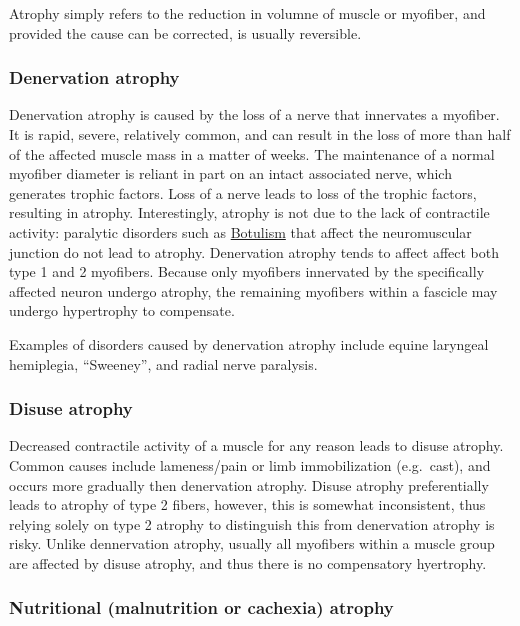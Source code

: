 \documentclass[openany]{book}
\begin{document}
Atrophy simply refers to the reduction in volumne of muscle or myofiber,
and provided the cause can be corrected, is usually reversible.

\subsubsection{Denervation atrophy}\label{denervation-atrophy}

Denervation atrophy is caused by the loss of a nerve that innervates a
myofiber. It is rapid, severe, relatively common, and can result in the
loss of more than half of the affected muscle mass in a matter of weeks.
The maintenance of a normal myofiber diameter is reliant in part on an
intact associated nerve, which generates trophic factors. Loss of a
nerve leads to loss of the trophic factors, resulting in atrophy.
Interestingly, atrophy is not due to the lack of contractile activity:
paralytic disorders such as \protect\hyperlink{botulism}{Botulism} that
affect the neuromuscular junction do not lead to atrophy. Denervation
atrophy tends to affect affect both type 1 and 2 myofibers. Because only
myofibers innervated by the specifically affected neuron undergo
atrophy, the remaining myofibers within a fascicle may undergo
hypertrophy to compensate.

Examples of disorders caused by denervation atrophy include equine
laryngeal hemiplegia, ``Sweeney'', and radial nerve paralysis.

\subsubsection{Disuse atrophy}\label{disuse-atrophy}

Decreased contractile activity of a muscle for any reason leads to
disuse atrophy. Common causes include lameness/pain or limb
immobilization (e.g.~cast), and occurs more gradually then denervation
atrophy. Disuse atrophy preferentially leads to atrophy of type 2
fibers, however, this is somewhat inconsistent, thus relying solely on
type 2 atrophy to distinguish this from denervation atrophy is risky.
Unlike dennervation atrophy, usually all myofibers within a muscle group
are affected by disuse atrophy, and thus there is no compensatory
hyertrophy.

\subsubsection{Nutritional (malnutrition or cachexia)
atrophy}\label{nutritional-malnutrition-or-cachexia-atrophy}
\end{document}
